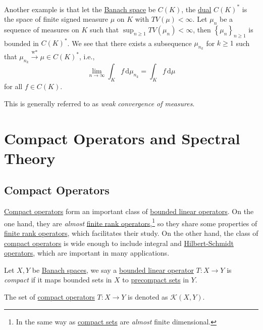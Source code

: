 Another example is that let the \hyperref[def:Banach-space]{Banach space} be \(C(K)\), the \hyperref[def:dual-space]{dual} \(C(K)^{\ast} \) is the space of finite signed measure \(\mu\) on \(K\) with \(TV(\mu )< \infty \). Let \(\mu _n\) be a sequence of measures on \(K\) such that \(\sup _{n\geq 1} TV(\mu _n) < \infty \), then \(\left\{ \mu _n \right\}_{n\geq 1} \) is bounded in \(C(K)^{\ast} \). We see that there exists a subsequence \(\mu _{n_k}\) for \(k\geq 1\) such that \(\mu _{n_k}\overset{\text{w*}}{\to } \mu \in C(K)^{\ast} \), i.e.,
\[
	\lim_{n \to \infty} \int _K f\,\mathrm{d} \mu _{n_k} = \int _K f\,\mathrm{d} \mu
\]
for all \(f\in C(K)\).

\begin{note}
	This is generally referred to as \emph{weak convergence of measures}.
\end{note}

\chapter{Compact Operators and Spectral Theory}

\section{Compact Operators}
\hyperref[def:compact-op]{Compact operators} form an important class of \hyperref[def:bounded-linear-op]{bounded linear operators}. On the one hand, they are \emph{almost} \hyperref[rmk:finite-rank-op]{finite rank operators},\footnote{In the same way as \hyperref[def:compact]{compact sets} are \emph{almost} finite dimensional.} so they share some properties of \hyperref[rmk:finite-rank-op]{finite rank operators}, which facilitates their study. On the other hand, the class of \hyperref[def:compact-op]{compact operators} is wide enough to include integral and \hyperref[def:Hilbert-Schmidt-op]{Hilbert-Schmidt operators}, which are important in many applications.

\begin{definition}\label{def:compact-op}
	Let \(X, Y\) be \hyperref[def:Banach-space]{Banach spaces}, we say a \hyperref[def:bounded-linear-op]{bounded linear operator} \(T\colon X\to Y\) is \emph{compact} if it maps bounded sets in \(X\) to \hyperref[def:precompact]{precompact sets} in \(Y\).
\end{definition}

\begin{notation}
	The set of \hyperref[def:compact-op]{compact operators} \(T\colon X\to Y\) is denoted as \(\mathcal{K} (X, Y)\).
\end{notation}

